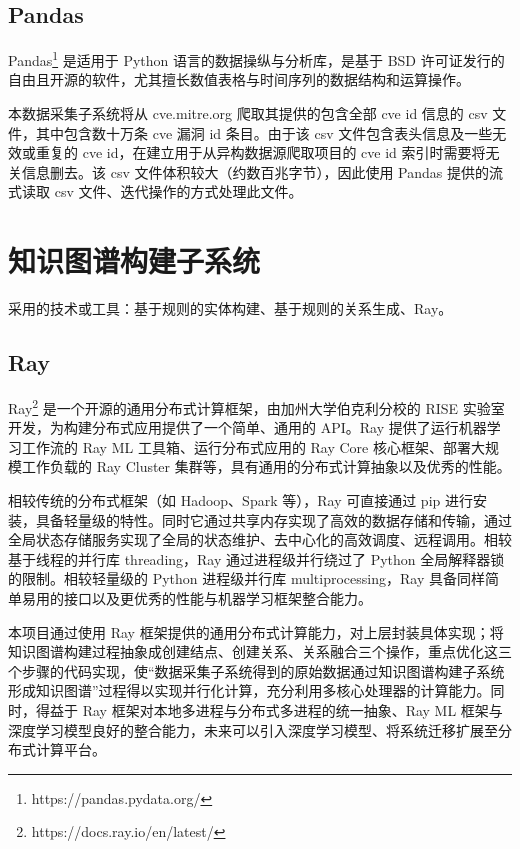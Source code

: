 \documentclass[a4paper,AutoFakeBold,oneside,12pt]{book}
\begin{document}
\subsection{Pandas}

Pandas\footnote{https://pandas.pydata.org/} 是适用于 Python 语言的数据操纵与分析库，是基于 BSD 许可证发行的自由且开源的软件，尤其擅长数值表格与时间序列的数据结构和运算操作。

本数据采集子系统将从 cve.mitre.org 爬取其提供的包含全部 cve id 信息的 csv 文件，其中包含数十万条 cve 漏洞 id 条目。由于该 csv 文件包含表头信息及一些无效或重复的 cve id，在建立用于从异构数据源爬取项目的 cve id 索引时需要将无关信息删去。该 csv 文件体积较大（约数百兆字节），因此使用 Pandas 提供的流式读取 csv 文件、迭代操作的方式处理此文件。

\section{知识图谱构建子系统}

采用的技术或工具：基于规则的实体构建、基于规则的关系生成、Ray。

\subsection{Ray}

Ray\footnote{https://docs.ray.io/en/latest/} 是一个开源的通用分布式计算框架，由加州大学伯克利分校的 RISE 实验室开发，为构建分布式应用提供了一个简单、通用的 API。Ray 提供了运行机器学习工作流的 Ray ML 工具箱、运行分布式应用的 Ray Core 核心框架、部署大规模工作负载的 Ray Cluster 集群等，具有通用的分布式计算抽象以及优秀的性能。

相较传统的分布式框架（如 Hadoop、Spark 等），Ray 可直接通过 pip 进行安装，具备轻量级的特性。同时它通过共享内存实现了高效的数据存储和传输，通过全局状态存储服务实现了全局的状态维护、去中心化的高效调度、远程调用。相较基于线程的并行库  threading，Ray 通过进程级并行绕过了 Python 全局解释器锁的限制。相较轻量级的 Python 进程级并行库 multiprocessing，Ray 具备同样简单易用的接口以及更优秀的性能与机器学习框架整合能力。

本项目通过使用 Ray 框架提供的通用分布式计算能力，对上层封装具体实现；将知识图谱构建过程抽象成创建结点、创建关系、关系融合三个操作，重点优化这三个步骤的代码实现，使“数据采集子系统得到的原始数据通过知识图谱构建子系统形成知识图谱”过程得以实现并行化计算，充分利用多核心处理器的计算能力。同时，得益于 Ray 框架对本地多进程与分布式多进程的统一抽象、Ray ML 框架与深度学习模型良好的整合能力，未来可以引入深度学习模型、将系统迁移扩展至分布式计算平台。
\end{document}
